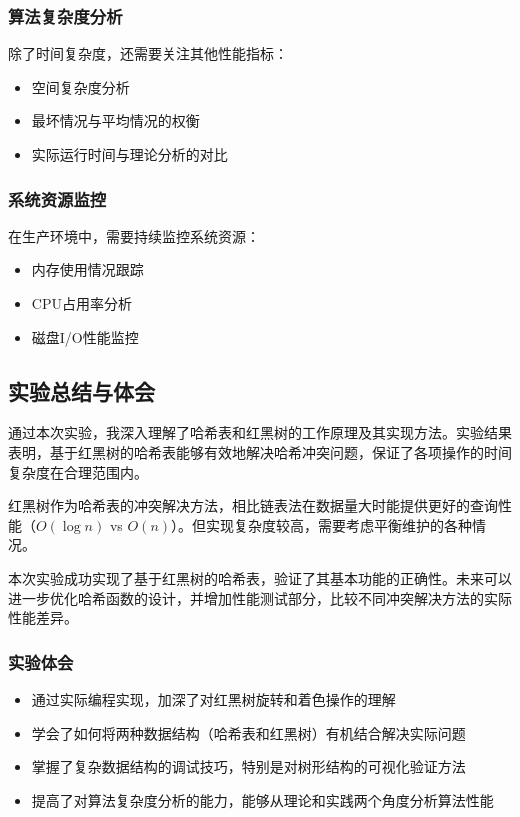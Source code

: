 \documentclass[12pt,a4paper]{article}
\begin{document}
\subsubsection{算法复杂度分析}
除了时间复杂度，还需要关注其他性能指标：
\begin{itemize}
\item 空间复杂度分析
\item 最坏情况与平均情况的权衡
\item 实际运行时间与理论分析的对比
\end{itemize}

\subsubsection{系统资源监控}
在生产环境中，需要持续监控系统资源：
\begin{itemize}
\item 内存使用情况跟踪
\item CPU占用率分析
\item 磁盘I/O性能监控
\end{itemize}

\subsection{实验总结与体会}
通过本次实验，我深入理解了哈希表和红黑树的工作原理及其实现方法。实验结果表明，基于红黑树的哈希表能够有效地解决哈希冲突问题，保证了各项操作的时间复杂度在合理范围内。

红黑树作为哈希表的冲突解决方法，相比链表法在数据量大时能提供更好的查询性能（$O(\log n)$ vs $O(n)$）。但实现复杂度较高，需要考虑平衡维护的各种情况。

本次实验成功实现了基于红黑树的哈希表，验证了其基本功能的正确性。未来可以进一步优化哈希函数的设计，并增加性能测试部分，比较不同冲突解决方法的实际性能差异。

\subsubsection{实验体会}
\begin{itemize}
\item 通过实际编程实现，加深了对红黑树旋转和着色操作的理解
\item 学会了如何将两种数据结构（哈希表和红黑树）有机结合解决实际问题
\item 掌握了复杂数据结构的调试技巧，特别是对树形结构的可视化验证方法
\item 提高了对算法复杂度分析的能力，能够从理论和实践两个角度分析算法性能
\end{itemize}
\end{document}
